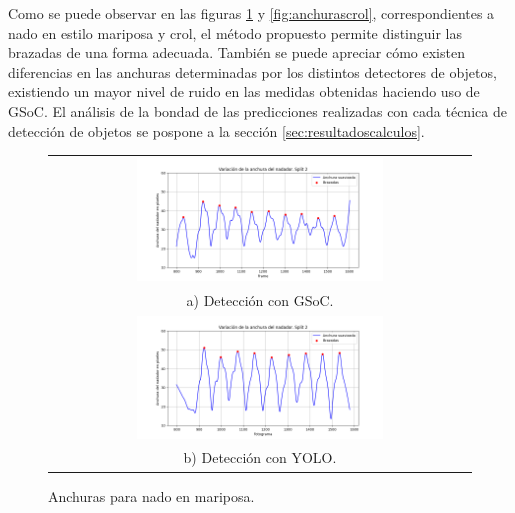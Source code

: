 Como se puede observar en las figuras \ref{fig:anchurasmariposa} y \ref{fig:anchurascrol}, correspondientes a nado en estilo mariposa y crol, el método propuesto permite distinguir las brazadas de una forma adecuada. También se puede apreciar cómo existen diferencias en las anchuras determinadas por los distintos detectores de objetos, existiendo un mayor nivel de ruido en las medidas obtenidas haciendo uso de GSoC. El análisis de la bondad de las predicciones realizadas con cada técnica de detección de objetos se pospone a la sección \ref{sec:resultadoscalculos}.

\begin{figure}
    \centering
    \begin{tabular}{c}
        \includegraphics[width=0.6\textwidth,height=\textheight,keepaspectratio]{imagenes/parte_graficas/anchuras_calle_3_mariposa_GSoC.png}  \\
        a) Detección con GSoC. \\
         \includegraphics[width=0.6\textwidth,height=\textheight,keepaspectratio]{imagenes/parte_graficas/anchuras_calle_3_mariposa_YOLO.png} \\
        b) Detección con YOLO.
    \end{tabular}
    \caption{Anchuras para nado en mariposa.} %
    \label{fig:anchurasmariposa}
\end{figure}


